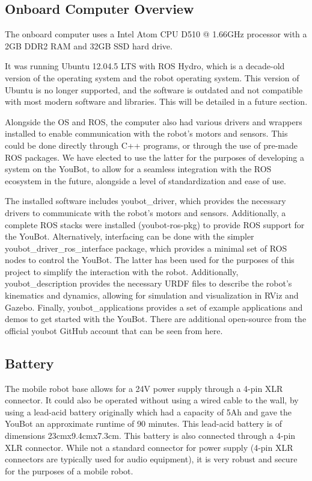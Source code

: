 \documentclass[a4paper, 12pt]{article}
\begin{document}
    \subsection{Onboard Computer Overview}

    The onboard computer uses a Intel Atom CPU D510 @ 1.66GHz processor with a 2GB DDR2 RAM and 32GB SSD hard drive. 

    It was running Ubuntu 12.04.5 LTS with ROS Hydro, which is a decade-old version of the operating system and the robot operating system. This version of Ubuntu is no longer supported, and the software is outdated and not compatible with most modern software and libraries. This will be detailed in a future section.

    Alongside the OS and ROS, the computer also had various drivers and wrappers installed to enable communication with the robot's motors and sensors. This could be done directly through C++ programs, or through the use of pre-made ROS packages. We have elected to use the latter for the purposes of developing a system on the YouBot, to allow for a seamless integration with the ROS ecosystem in the future, alongside a level of standardization and ease of use. 

    The installed software includes youbot\_driver, which provides the necessary drivers to communicate with the robot's motors and sensors. Additionally, a complete ROS stacks were installed (youbot-ros-pkg) to provide ROS support for the YouBot. Alternatively, interfacing can be done with the simpler youbot\_driver\_ros\_interface package, which provides a minimal set of ROS nodes to control the YouBot. The latter has been used for the purposes of this project to simplify the interaction with the robot. Additionally, youbot\_description provides the necessary URDF files to describe the robot's kinematics and dynamics, allowing for simulation and visualization in RViz and Gazebo. Finally, youbot\_applications provides a set of example applications and demos to get started with the YouBot. There are additional open-source from the official youbot GitHub account that can be seen from here. 



    \subsection{Battery}
    
    The mobile robot base allows for a 24V power supply through a 4-pin XLR connector. It could also be operated without using a wired cable to the wall, by using a lead-acid battery originally which had a capacity of 5Ah and gave the YouBot an approximate runtime of 90 minutes. This lead-acid battery is of dimensions 23cmx9.4cmx7.3cm. This battery is also connected through a 4-pin XLR connector. While not a standard connector for power supply (4-pin XLR connectors are typically used for audio equipment), it is very robust and secure for the purposes of a mobile robot. 
\end{document}
